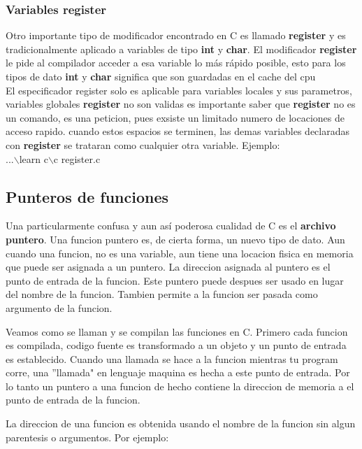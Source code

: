 \documentclass[]{article}
\begin{document}
	\subsubsection{Variables register}
	
	Otro importante tipo de modificador encontrado en C es llamado \textbf{register} y es tradicionalmente aplicado a variables de tipo \textbf{int} y \textbf{char}. El modificador \textbf{register} le pide al compilador acceder a esa variable lo más rápido posible, esto para los tipos de dato \textbf{int} y \textbf{char} significa que son guardadas en el cache del cpu\\
	
	El especificador register solo es aplicable para variables locales y sus parametros, variables globales \textbf{register} no son validas es importante saber que \textbf{register} no es un comando, es una peticion, pues exsiste un limitado numero de locaciones de acceso rapido. cuando estos espacios se terminen, las demas variables declaradas con \textbf{register} se trataran como cualquier otra variable. Ejemplo:\\
	
	...$\backslash$learn c$\backslash$c register.c\\
	
	\subsection{Punteros de funciones}
	
	Una particularmente confusa y aun así poderosa cualidad de C es el \textbf{archivo puntero}. Una funcion puntero es, de cierta forma, un nuevo tipo de dato. Aun cuando una funcion, no es una variable, aun tiene una locacion fisica en memoria que puede ser asignada a un puntero. La direccion asignada al puntero es el punto de entrada de la funcion. Este puntero puede despues ser usado en lugar del nombre de la funcion. Tambien permite a la funcion ser pasada como argumento de la funcion.
	
	Veamos como se llaman y se compilan las funciones en C. Primero cada funcion es compilada, codigo fuente es transformado a un objeto y un punto de entrada es establecido. Cuando una llamada se hace a la funcion mientras tu program corre, una ''llamada" en lenguaje maquina es hecha a este punto de entrada. Por lo tanto un puntero a una funcion de hecho contiene la direccion de memoria a el punto de entrada de la funcion.
	
	La direccion de una funcion es obtenida usando el nombre de la funcion sin algun parentesis o argumentos. Por ejemplo:\\
	
\end{document}
